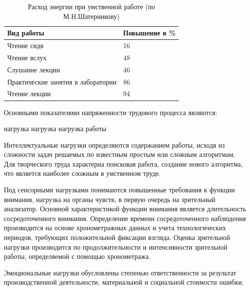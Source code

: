 \documentclass[14pt,a4paper]{reportmod}
\begin{document}
\begin{table}[ht]
  \caption{Расход энергии при умственной работе (по М.Н.Шатерникову)}
  \begin{center}
  \small {
    \begin{tabular}{|m{10cm}|m{4cm}|}
      \hline
      \bfseries{Вид работы} &
      \bfseries{Повышение в \%} \\
      \hline
      Чтение сидя & 16 \\
      \hline
      Чтение вслух & 48 \\
      \hline
      Слушание лекции & 46 \\
      \hline
      Практические занятия в лаборатории & 86 \\
      \hline
      Чтение лекции & 94 \\
      \hline
    \end{tabular}
  }
  \end{center}
  \label{table:energy}
\end{table}

Основными показателями напряженности трудового процесса являются:
\begin{itemize}
   нагрузка
   нагрузка
   нагрузка
   работы
\end{itemize}
Интеллектуальные нагрузки определяются содержанием работы, исходя из сложности задач решаемых по известным простым или сложным алгоритмам. Для творческого труда характерна поисковая работа, создание нового алгоритма, что является наиболее сложным в умственном труде.


Под сенсорными нагрузками понимаются повышенные требования к функции внимания, нагрузка на органы чувств, в первую очередь на зрительный анализатор. Основной характеристикой функции внимания является длительность сосредоточенного внимания. Определение времени сосредоточенного наблюдения производится на основе хронометражных данных и учета технологических периодов, требующих положительной фиксации взгляда. Оценка зрительной нагрузки производится по продолжительности и интенсивности зрительной работы, определяемой с помощью хронометража.


Эмоциональные нагрузки обусловлены степенью ответственности за результат производственной деятельности, материальной и социальной стоимости ошибки.
\end{document}
